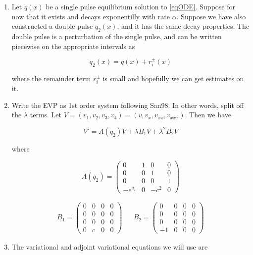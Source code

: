 \documentclass[12pt]{article}
\begin{document}
\begin{enumerate}

\item Let $q(x)$ be a single pulse equilibrium solution to \eqref{eqODE}. Suppose for now that it exists and decays exponentilly with rate $\alpha$. Suppose we have also constructed a double pulse $q_2(x)$, and it has the same decay properties. The double pulse is a perturbation of the single pulse, and can be written piecewise on the appropriate intervals as

\[
q_2(x) = q(x) + r_i^\pm(x)
\]

where the remainder term $r_i^\pm$ is small and hopefully we can get estimates on it.

\item Write the EVP as 1st order system following San98. In other words, split off the $\lambda$ terms. Let $V = (v_1, v_2, v_3, v_4) = (v, v_x, v_{xx}, v_{xxx})$. Then we have

\begin{equation}\label{splitevp}
V' = A(q_2)V + \lambda B_1 V + \lambda^2 B_2 V
\end{equation}

where

\begin{equation}
A(q_2) = \begin{pmatrix}
0 & 1 & 0 & 0 \\
0 & 0 & 1 & 0 \\
0 & 0 & 0 & 1 \\
-e^{q_2} & 0 & -c^2 & 0 
\end{pmatrix}
\end{equation}

\begin{align*}
B_1 = \begin{pmatrix}
0 & 0 & 0 & 0 \\
0 & 0 & 0 & 0 \\
0 & 0 & 0 & 0 \\
0 & c & 0 & 0 
\end{pmatrix} &&
B_2 = \begin{pmatrix}
0 & 0 & 0 & 0 \\
0 & 0 & 0 & 0 \\
0 & 0 & 0 & 0 \\
-1 & 0 & 0 & 0 
\end{pmatrix}
\end{align*}

\item The variational and adjoint variational equations we will use are


\end{enumerate}
\end{document}
